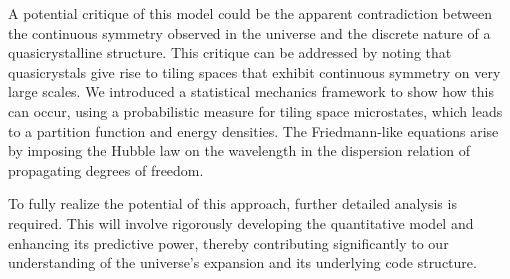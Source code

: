 \documentclass{article}
\begin{document}
A potential critique of this model could be the apparent contradiction between the continuous symmetry observed in the universe and the discrete nature of a quasicrystalline structure. This critique can be addressed by noting that quasicrystals give rise to tiling spaces that exhibit continuous symmetry on very large scales. We introduced a statistical mechanics framework to show how this can occur, using a probabilistic measure for tiling space microstates, which leads to a partition function and energy densities. The Friedmann-like equations arise by imposing the Hubble law on the wavelength in the dispersion relation of propagating degrees of freedom.

To fully realize the potential of this approach, further detailed analysis is required. This will involve rigorously developing the quantitative model and enhancing its predictive power, thereby contributing significantly to our understanding of the universe's expansion and its underlying code structure.






%  
%  
\end{document}
